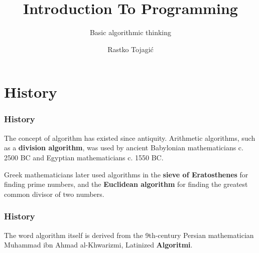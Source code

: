 \documentclass{beamer}
\title{Introduction To Programming}
\subtitle{Basic algorithmic thinking}
\author{Rastko Tojagi\' c}
\newcommand{\bfemph}[1]{\textbf{#1}}
\renewcommand{\emph}[1]{\bfemph{#1}}
\begin{document}
\maketitle


\section{History}
\begin{frame}
    \frametitle{History}
    The concept of algorithm has existed since antiquity.
    Arithmetic algorithms, such as a \emph{division algorithm}, was used by ancient Babylonian mathematicians c. 2500 BC and Egyptian mathematicians c. 1550 BC.
    
    \bigskip
    
    Greek mathematicians later used algorithms in the \emph{sieve of Eratosthenes}
    for finding prime numbers, and the \emph{Euclidean algorithm} for finding the greatest common divisor of two numbers.
    
\end{frame}

\begin{frame}
    \frametitle{History}
    The word algorithm itself is derived from the 9th-century Persian mathematician Muhammad ibn Ahmad al-Khwarizmi, Latinized \emph{Algoritmi}.
\end{frame}    
\end{document}
